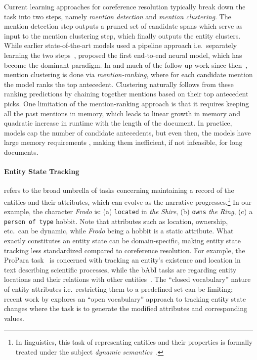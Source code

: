 \documentclass[12pt]{thesis-umich}[thesis]
\begin{document}
Current learning approaches for coreference resolution typically break down the task into two steps, namely \textit{mention detection} and \textit{mention clustering}. 
The mention detection step outputs a pruned set of candidate spans which serve as input to the mention clustering step, which finally outputs the entity clusters. 
While earlier state-of-the-art models used a pipeline approach i.e.\ separately learning the two steps~\citep{durrett2013easy,wiseman-etal-2015-learning},  \citet{lee-etal-2017-end} proposed the first end-to-end neural model, which has become the dominant paradigm. 
In \citet{lee-etal-2017-end} and much of the follow up work since then~\citep[\emph{inter alia}]{lee-etal-2018-higher, joshi-etal-2019-bert, xu-choi-2020-revealing, kantor-globerson-2019-coreference}, mention clustering is done via \emph{mention-ranking}, where for each candidate mention the model ranks the top antecedent. Clustering naturally follows from these ranking predictions by chaining together mentions based on their top antecedent picks. 
One limitation of the mention-ranking approach is that it requires keeping all the past mentions in memory, which leads to linear growth in memory and quadratic increase in runtime with the length of the document. 
In practice, models cap the number of candidate antecedents, but even then, the models have large memory requirements \cite{xia-etal-2020-incremental}, making them inefficient, if not infeasible, for long documents.



\paragraph{Entity State Tracking} refers to the broad umbrella of tasks concerning maintaining a record of the entities and their attributes, which can evolve as the narrative progresses.\footnote{In linguistics, this task of representing entities and their properties is formally treated under the subject \emph{dynamic semantics}~\cite{heim1983file}.} 
In our example, the character \emph{Frodo} is: (a) \texttt{located} in \emph{the Shire},  (b) \texttt{owns} \emph{the Ring}, (c) a \texttt{person of type} hobbit. Note that attributes such as location, ownership, etc.\ can be dynamic, while \emph{Frodo} being a hobbit is a static attribute. 
What exactly constitutes an entity state can be domain-specific, making entity state tracking less standardized compared to coreference resolution. 
For example, the ProPara task~\cite{dalvi-etal-2018-tracking} is concerned with tracking an entity's existence and location in text describing scientific processes, while the bAbI tasks are regarding entity locations and their relations with other entities~\cite{weston2015aicomplete}. 
The ``closed vocabulary'' nature of entity attributes i.e.\ restricting them to a predefined set can be limiting; recent work by \citet{tandon-etal-2020-dataset} explores an ``open vocabulary'' approach to tracking entity state changes where the task is to generate the modified attributes and corresponding values.  
\end{document}
